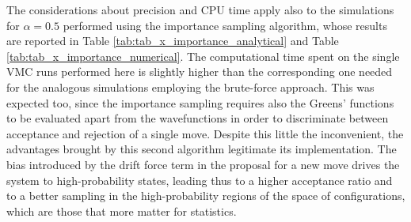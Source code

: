 The considerations about precision and CPU time apply also to the simulations for $\alpha=0.5$ performed using the importance sampling algorithm, whose results are reported in Table \ref{tab:tab_x_importance_analytical} and Table \ref{tab:tab_x_importance_numerical}. The computational time spent on the single VMC runs performed here is slightly higher than the corresponding one needed for the analogous simulations employing the brute-force approach. This was expected too, since the importance sampling requires also the Greens' functions to be evaluated apart from the wavefunctions in order to discriminate between acceptance and rejection of a single move. Despite this little the inconvenient, the advantages brought by this second algorithm legitimate its implementation. The bias introduced by the drift force term in the proposal for a new move drives the system to high-probability states, leading thus to a higher acceptance ratio and to a better sampling in the high-probability regions of the space of configurations, which are those that more matter for statistics. \\


